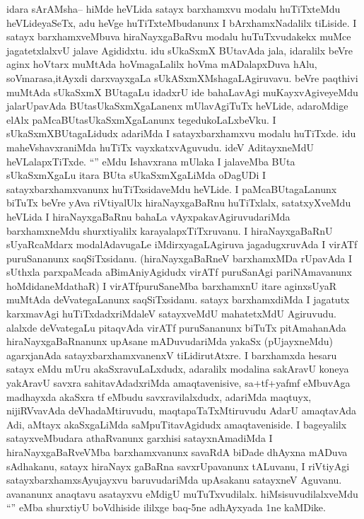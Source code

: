 \begin{artha}
idara sArAMsha-- hiMde heVLida satayx barxhamxvu modalu huTiTxteMdu heVLideyaSeTx, adu heVge huTiTxteMbudanunx I bArxhamxNadalilx tiLiside. I satayx barxhamxveMbuva hiraNayxgaBaRvu modalu huTuTxvudakekx muMce jagatetxlalxvU jalave Agididxtu. idu sUkaSxmX BUtavAda jala, idaralilx beVre aginx hoVtarx muMtAda hoVmagaLalilx hoVma mADalapxDuva hAlu, soVmarasa,itAyxdi darxvayxgaLa sUkASxmXMshagaLAgiruvavu. beVre paqthivi muMtAda sUkaSxmX BUtagaLu idadxrU ide bahaLavAgi muKayxvAgiveyeMdu jalarUpavAda BUtasUkaSxmXgaLanenx mUlavAgiTuTx heVLide, adaroMdige elAlx paMcaBUtasUkaSxmXgaLanunx tegedukoLaLxbeVku. I sUkaSxmXBUtagaLidudx adariMda I satayxbarxhamxvu modalu huTiTxde. idu maheVshavxraniMda huTiTx vayxkatxvAguvudu. ideV AditayxneMdU heVLalapxTiTxde. ``\stext'' eMdu Ishavxrana mUlaka I jalaveMba BUta sUkaSxmXgaLu itara BUta sUkaSxmXgaLiMda oDagUDi I satayxbarxhamxvanunx huTiTxsidaveMdu heVLide. I paMcaBUtagaLanunx biTuTx beVre yAva riVtiyalUlx hiraNayxgaBaRnu huTiTxlalx, satatxyXveMdu heVLida I hiraNayxgaBaRnu bahaLa vAyxpakavAgiruvudariMda barxhamxneMdu shurxtiyalilx karayalapxTiTxruvanu. I hiraNayxgaBaRnU sUyaRcaMdarx modalAdavugaLe iMdirxyagaLAgiruva jagadugxruvAda I virATf puruSananunx saqSiTxsidanu. (hiraNayxgaBaRneV barxhamxMDa rUpavAda I sUthxla parxpaMcada aBimAniyAgidudx virATf puruSanAgi pariNAmavanunx hoMdidaneMdathaR) I virATfpuruSaneMba barxhamxnU itare aginxsUyaR muMtAda deVvategaLanunx saqSiTxsidanu. satayx barxhamxdiMda I jagatutx karxmavAgi huTiTxdadxriMdaleV satayxveMdU mahatetxMdU Agiruvudu. alalxde deVvategaLu pitaqvAda virATf puruSananunx biTuTx pitAmahanAda hiraNayxgaBaRnanunx upAsane mADuvudariMda yakaSx (pUjayxneMdu) agarxjanAda satayxbarxhamxvanenxV tiLidirutAtxre. I barxhamxda hesaru satayx eMdu mUru akaSxravuLaLxdudx, adaralilx modalina sakAravU koneya yakAravU savxra sahitavAdadxriMda amaqtavenisive, sa+tf+yafmf eMbuvAga madhayxda akaSxra tf eMbudu savxravilalxdudx, adariMda maqtuyx, nijiRVvavAda deVhadaMtiruvudu, maqtapaTaTxMtiruvudu AdarU amaqtavAda Adi, aMtayx akaSxgaLiMda saMpuTitavAgidudx amaqtaveniside. I bageyalilx satayxveMbudara athaRvanunx garxhisi satayxnAmadiMda I hiraNayxgaBaRveVMba barxhamxvanunx savaRdA biDade dhAyxna mADuva sAdhakanu, satayx hiraNayx gaBaRna savxrUpavanunx tALuvanu, I riVtiyAgi satayxbarxhamxsAyujayxvu baruvudariMda upAsakanu satayxneV Aguvanu. avananunx anaqtavu asatayxvu eMdigU muTuTxvudilalx. hiMsisuvudilalxveMdu ``\stext'' eMba shurxtiyU boVdhiside ililxge baq-5ne adhAyxyada 1ne kaMDike.
\end{artha}

